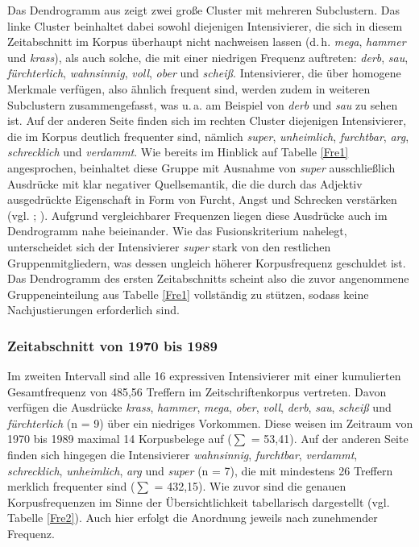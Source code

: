 \noindent Das Dendrogramm aus  zeigt zwei große Cluster mit mehreren Subclustern. Das linke Cluster beinhaltet dabei sowohl diejenigen Intensivierer, die sich in diesem Zeitabschnitt im Korpus überhaupt nicht nachweisen lassen (d.\,h. \textit{mega}, \textit{hammer} und \textit{krass}), als auch solche, die mit einer niedrigen Frequenz auftreten: \textit{derb}, \textit{sau}, \textit{fürchterlich}, \textit{wahnsinnig}, \textit{voll}, \textit{ober} und \textit{scheiß}. Intensivierer, die über homogene Merkmale verfügen, also  ähnlich frequent sind, werden zudem in weiteren Subclustern zusammengefasst, was u.\,a. am Beispiel von \textit{derb} und \textit{sau} zu sehen ist. Auf der anderen Seite finden sich im rechten Cluster diejenigen Intensivierer, die im Korpus deutlich frequenter sind, nämlich \textit{super}, \textit{unheimlich}, \textit{furchtbar}, \textit{arg}, \textit{schrecklich} und \textit{verdammt}. Wie bereits im Hinblick auf Tabelle \ref{Fre1} angesprochen, beinhaltet diese Gruppe mit Ausnahme von \textit{super} ausschließlich Ausdrücke mit klar negativer Quellsemantik, die die durch das Adjektiv ausgedrückte Eigenschaft in Form von Furcht, Angst und Schrecken verstärken (vgl. \citealt[165ff.]{Biedermann.1969}; \citealt[]{Hentschel.1998b}). Aufgrund vergleichbarer Frequenzen liegen diese Ausdrücke auch im Dendrogramm nahe beieinander. Wie das Fusionskriterium nahelegt, unterscheidet sich der Intensivierer \textit{super} stark von den restlichen Gruppenmitgliedern, was dessen ungleich höherer Korpusfrequenz geschuldet ist. Das Dendrogramm des ersten Zeitabschnitts scheint also die zuvor angenommene Gruppeneinteilung aus Tabelle \ref{Fre1} vollständig zu stützen, sodass keine Nachjustierungen erforderlich sind.

\subsubsection{Zeitabschnitt von 1970 bis 1989}
Im zweiten Intervall sind alle 16 expressiven Intensivierer mit einer kumulierten Gesamtfrequenz von 485,56 Treffern im Zeitschriftenkorpus vertreten. Davon verfügen die Ausdrücke \textit{krass}, \textit{hammer}, \textit{mega}, \textit{ober}, \textit{voll}, \textit{derb}, \textit{sau}, \textit{scheiß} und \textit{fürchterlich} (n = 9) über ein niedriges Vorkommen. Diese weisen im Zeitraum von 1970 bis 1989 maximal 14 Korpusbelege auf (${\scriptstyle \sum{}}$ = 53,41). Auf der anderen Seite finden sich hingegen die Intensivierer \textit{wahnsinnig}, \textit{furchtbar}, \textit{verdammt}, \textit{schrecklich}, \textit{unheimlich}, \textit{arg} und \textit{super} (n = 7), die mit mindestens 26 Treffern merklich frequenter sind (${\scriptstyle \sum{}}$ = 432,15). Wie zuvor sind die genauen Korpusfrequenzen im Sinne der Übersichtlichkeit tabellarisch dargestellt (vgl. Tabelle \ref{Fre2}). Auch hier erfolgt die Anordnung jeweils nach zunehmender Frequenz.


